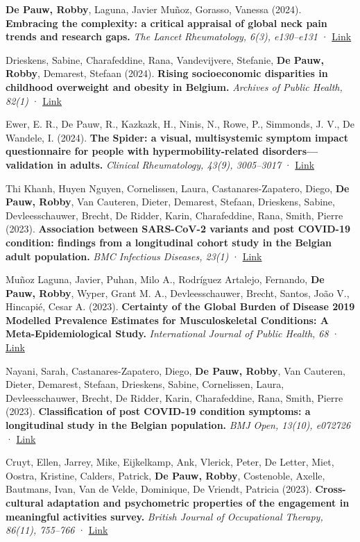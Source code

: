 \documentclass[
  letterpaper,
  DIV=11,
  numbers=noendperiod]{scrartcl}
\begin{document}
\textbf{De Pauw, Robby}, Laguna, Javier Muñoz, Gorasso, Vanessa (2024).
\textbf{Embracing the complexity: a critical appraisal of global neck
pain trends and research gaps.} \emph{The Lancet Rheumatology, 6(3),
e130--e131} ·
\href{http://dx.doi.org/10.1016/S2665-9913(24)00003-1}{Link}

Drieskens, Sabine, Charafeddine, Rana, Vandevijvere, Stefanie,
\textbf{De Pauw, Robby}, Demarest, Stefaan (2024). \textbf{Rising
socioeconomic disparities in childhood overweight and obesity in
Belgium.} \emph{Archives of Public Health, 82(1)} ·
\href{http://dx.doi.org/10.1186/S13690-024-01328-Y}{Link}

Ewer, E. R., De Pauw, R., Kazkazk, H., Ninis, N., Rowe, P., Simmonds, J.
V., De Wandele, I. (2024). \textbf{The Spider: a visual, multisystemic
symptom impact questionnaire for people with hypermobility-related
disorders---validation in adults.} \emph{Clinical Rheumatology, 43(9),
3005--3017} · \href{http://dx.doi.org/10.1007/S10067-024-07071-7}{Link}

Thi Khanh, Huyen Nguyen, Cornelissen, Laura, Castanares-Zapatero, Diego,
\textbf{De Pauw, Robby}, Van Cauteren, Dieter, Demarest, Stefaan,
Drieskens, Sabine, Devleesschauwer, Brecht, De Ridder, Karin,
Charafeddine, Rana, Smith, Pierre (2023). \textbf{Association between
SARS-CoV-2 variants and post COVID-19 condition: findings from a
longitudinal cohort study in the Belgian adult population.} \emph{BMC
Infectious Diseases, 23(1)} ·
\href{http://dx.doi.org/10.1186/S12879-023-08787-8}{Link}

Muñoz Laguna, Javier, Puhan, Milo A., Rodríguez Artalejo, Fernando,
\textbf{De Pauw, Robby}, Wyper, Grant M. A., Devleesschauwer, Brecht,
Santos, João V., Hincapié, Cesar A. (2023). \textbf{Certainty of the
Global Burden of Disease 2019 Modelled Prevalence Estimates for
Musculoskeletal Conditions: A Meta-Epidemiological Study.}
\emph{International Journal of Public Health, 68} ·
\href{http://dx.doi.org/10.3389/IJPH.2023.1605763}{Link}

Nayani, Sarah, Castanares-Zapatero, Diego, \textbf{De Pauw, Robby}, Van
Cauteren, Dieter, Demarest, Stefaan, Drieskens, Sabine, Cornelissen,
Laura, Devleesschauwer, Brecht, De Ridder, Karin, Charafeddine, Rana,
Smith, Pierre (2023). \textbf{Classification of post COVID-19 condition
symptoms: a longitudinal study in the Belgian population.} \emph{BMJ
Open, 13(10), e072726} ·
\href{http://dx.doi.org/10.1136/BMJOPEN-2023-072726}{Link}

Cruyt, Ellen, Jarrey, Mike, Eijkelkamp, Ank, Vlerick, Peter, De Letter,
Miet, Oostra, Kristine, Calders, Patrick, \textbf{De Pauw, Robby},
Costenoble, Axelle, Bautmans, Ivan, Van de Velde, Dominique, De Vriendt,
Patricia (2023). \textbf{Cross-cultural adaptation and psychometric
properties of the engagement in meaningful activities survey.}
\emph{British Journal of Occupational Therapy, 86(11), 755--766} ·
\href{http://dx.doi.org/10.1177/03080226231187827}{Link}
\end{document}
